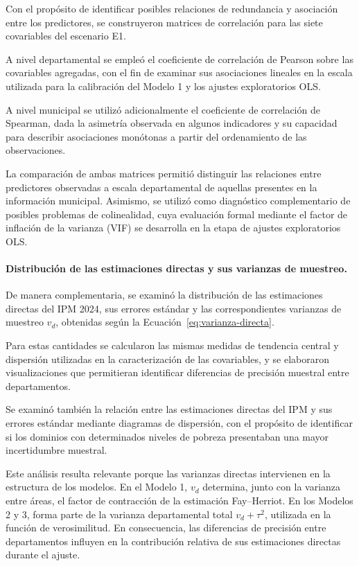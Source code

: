 Con el propósito de identificar posibles relaciones de redundancia y asociación entre los predictores, se construyeron matrices de correlación para las siete covariables del escenario E1.

A nivel departamental se empleó el coeficiente de correlación de Pearson sobre las covariables agregadas, con el fin de examinar sus asociaciones lineales en la escala utilizada para la calibración del Modelo 1 y los ajustes exploratorios OLS.

A nivel municipal se utilizó adicionalmente el coeficiente de correlación de Spearman, dada la asimetría observada en algunos indicadores y su capacidad para describir asociaciones monótonas a partir del ordenamiento de las observaciones.

La comparación de ambas matrices permitió distinguir las relaciones entre predictores observadas a escala departamental de aquellas presentes en la información municipal. Asimismo, se utilizó como diagnóstico complementario de posibles problemas de colinealidad, cuya evaluación formal mediante el factor de inflación de la varianza (VIF) se desarrolla en la etapa de ajustes exploratorios OLS.

\paragraph{Distribución de las estimaciones directas y sus varianzas de muestreo.}

De manera complementaria, se examinó la distribución de las estimaciones directas del IPM 2024, sus errores estándar y las correspondientes varianzas de muestreo $v_d$, obtenidas según la Ecuación~\ref{eq:varianza-directa}.

Para estas cantidades se calcularon las mismas medidas de tendencia central y dispersión utilizadas en la caracterización de las covariables, y se elaboraron visualizaciones que permitieran identificar diferencias de precisión muestral entre departamentos.

Se examinó también la relación entre las estimaciones directas del IPM y sus errores estándar mediante diagramas de dispersión, con el propósito de identificar si los dominios con determinados niveles de pobreza presentaban una mayor incertidumbre muestral.

Este análisis resulta relevante porque las varianzas directas intervienen en la estructura de los modelos. En el Modelo 1, $v_d$ determina, junto con la varianza entre áreas, el factor de contracción de la estimación Fay--Herriot. En los Modelos 2 y 3, forma parte de la varianza departamental total $v_d+\tau^2$, utilizada en la función de verosimilitud. En consecuencia, las diferencias de precisión entre departamentos influyen en la contribución relativa de sus estimaciones directas durante el ajuste.

